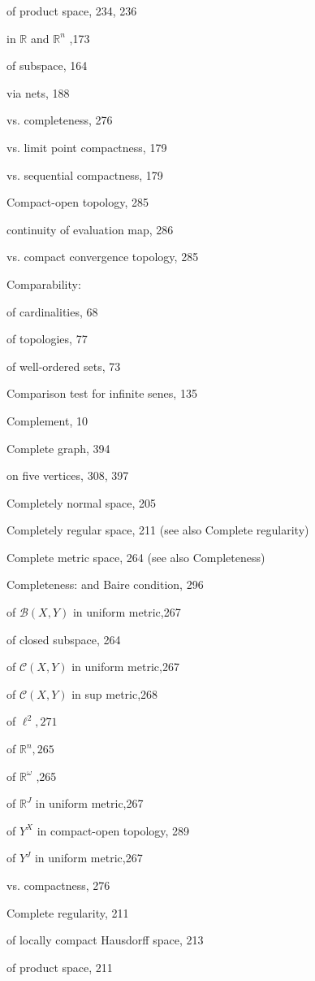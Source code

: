 of product space, 234, 236

in \(\mathbb{R}\) and \({\mathbb{R}}^{n}\) ,173

of subspace, 164

via nets, 188

vs. completeness, 276

vs. limit point compactness, 179

vs. sequential compactness, 179

Compact-open topology, 285

continuity of evaluation map, 286

vs. compact convergence topology, 285

Comparability:

of cardinalities, 68

of topologies, 77

of well-ordered sets, 73

Comparison test for infinite senes, 135

Complement, 10

Complete graph, 394

on five vertices, 308, 397

Completely normal space, 205

Completely regular space, 211 (see also Complete regularity)

Complete metric space, 264 (see also Completeness)

Completeness: and Baire condition, 296

of \(\mathcal{B}\left( {X,Y}\right)\) in uniform metric,267

of closed subspace, 264

of \(\mathcal{C}\left( {X,Y}\right)\) in uniform metric,267

of \(\mathcal{C}\left( {X,Y}\right)\) in sup metric,268

of \({\ell }^{2},{271}\)

of \({\mathbb{R}}^{n},{265}\)

of \({\mathbb{R}}^{\omega }\) ,265

of \({\mathbb{R}}^{J}\) in uniform metric,267

of \({Y}^{X}\) in compact-open topology, 289

of \({Y}^{J}\) in uniform metric,267

vs. compactness, 276

Complete regularity, 211

of locally compact Hausdorff space, 213

of product space, 211

